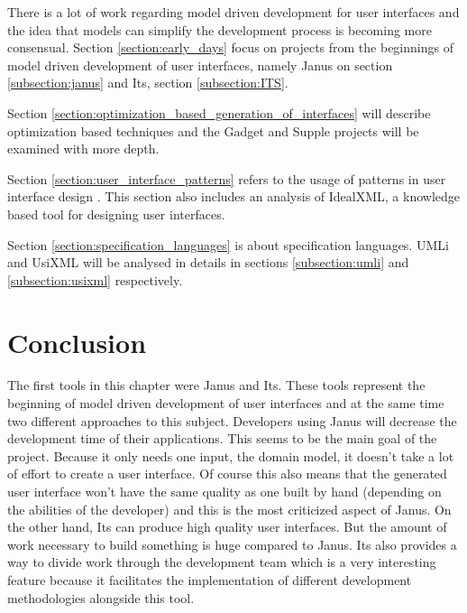 There is a lot of work regarding model driven development for user interfaces and the idea that models can simplify the development process is becoming more consensual. Section \ref{section:early_days} focus on projects from the beginnings of model driven development of user interfaces, namely Janus on section \ref{subsection:janus} and Its, section \ref{subsection:ITS}.

Section \ref{section:optimization_based_generation_of_interfaces} will describe optimization based techniques and the Gadget and Supple projects will be examined with more depth.

Section \ref{section:user_interface_patterns} refers to the usage of patterns in user interface design . This section also includes an analysis of IdealXML, a knowledge based tool for designing user interfaces.

Section \ref{section:specification_languages} is about specification languages. UMLi and UsiXML will be analysed in details in sections \ref{subsection:umli} and \ref{subsection:usixml} respectively.






\section{Conclusion}

The first tools in this chapter were Janus\cite{janus} and Its\cite{ITS}. These tools represent the beginning of model driven development of user interfaces and at the same time two different approaches to this subject. Developers using Janus will decrease the development time of their applications. This seems to be the main goal of the project. Because it only needs one input, the domain model, it doesn't take a lot of effort to create a user interface. Of course this also means that the generated user interface won't have the same quality as one built by hand (depending on the abilities of the developer) and this is the most criticized aspect of Janus. On the other hand, Its can produce high quality user interfaces. But the amount of work necessary to build something is huge compared to Janus. Its also provides a way to divide work through the development team which is a very interesting feature because it facilitates the implementation of different development methodologies alongside this tool.

